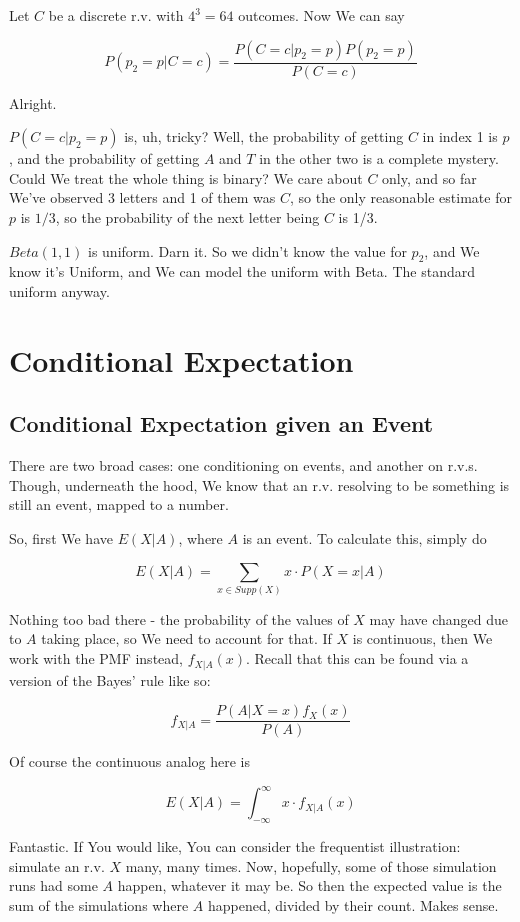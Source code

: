 \documentclass{article}
\begin{document}
			Let $C$ be a discrete r.v. with $4^3 = 64$ outcomes. Now We can say
			
			\[ P(p_2=p|C=c) = \frac{P(C=c|p_2=p)P(p_2=p)}{P(C=c)} \]
			
			Alright.  
			
			$P(C=c|p_2=p)$ is, uh, tricky? Well, the probability of getting $C$ in index 1 is $p$, and the probability of getting $A$ and $T$ in the other two is a complete mystery. Could We treat the whole thing is binary? We care about $C$ only, and so far We've observed 3 letters and 1 of them was $C$, so the only reasonable estimate for $p$ is $1/3$, so the probability of the next letter being $C$ is 1/3.
			
			$Beta(1, 1)$ is uniform. Darn it. So we didn't know the value for $p_2$, and We know it's Uniform, and We can model the uniform with Beta. The standard uniform anyway.


\newpage			
\section{Conditional Expectation}
	\subsection{Conditional Expectation given an Event}
	
		There are two broad cases: one conditioning on events, and another on r.v.s. Though, underneath the hood, We know that an r.v. resolving to be something is still an event, mapped to a number.
		
		So, first We have $E(X|A)$, where $A$ is an event. To calculate this, simply do
		
		\[ E(X|A) = \sum_{x\in Supp(X)} x\cdot P(X=x|A) \]

		Nothing too bad there - the probability of the values of $X$ may have changed due to $A$ taking place, so We need to account for that. If $X$ is continuous, then We work with the PMF instead, $f_{X|A}(x)$. Recall that this can be found via a version of the Bayes' rule like so:
		
		\[ f_{X|A} = \frac{P(A|X=x)f_X(x)}{P(A)	} \]
		
		Of course the continuous analog here is
		
		\[ E(X|A) = \int^\infty_{-\infty} x\cdot f_{X|A}(x) \]

		Fantastic. If You would like, You can consider the frequentist illustration: simulate an r.v. $X$ many, many  times. Now, hopefully, some of those simulation runs had some $A$ happen, whatever it may be. So then the expected value is the sum of the simulations where $A$ happened, divided by their count. Makes sense.
		
\end{document}
